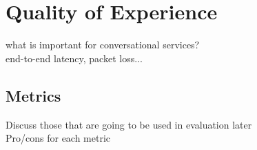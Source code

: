 \section{Quality of Experience}
what is important for conversational services? \\
end-to-end latency, packet loss...

\subsection{Metrics}
Discuss those that are going to be used in evaluation later \\
Pro/cons for each metric

